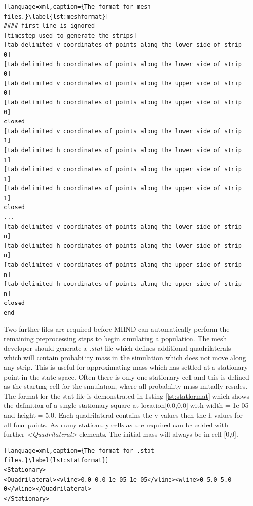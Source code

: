\documentclass[utf8]{frontiers_suppmat} %
\begin{document}
\begin{lstlisting}[language=xml,caption={The format for mesh files.}\label{lst:meshformat}]
#### first line is ignored
[timestep used to generate the strips]
[tab delimited v coordinates of points along the lower side of strip 0]
[tab delimited h coordinates of points along the lower side of strip 0]
[tab delimited v coordinates of points along the upper side of strip 0]
[tab delimited h coordinates of points along the upper side of strip 0]
closed
[tab delimited v coordinates of points along the lower side of strip 1]
[tab delimited h coordinates of points along the lower side of strip 1]
[tab delimited v coordinates of points along the upper side of strip 1]
[tab delimited h coordinates of points along the upper side of strip 1]
closed
...
[tab delimited v coordinates of points along the lower side of strip n]
[tab delimited h coordinates of points along the lower side of strip n]
[tab delimited v coordinates of points along the upper side of strip n]
[tab delimited h coordinates of points along the upper side of strip n]
closed
end
\end{lstlisting}

Two further files are required before MIIND can automatically perform the remaining preprocessing steps to begin simulating a population. The mesh developer should generate a \textit{.stat} file which defines additional quadrilaterals which will contain probability mass in the simulation which does not move along any strip. This is useful for approximating mass which has settled at a stationary point in the state space. Often there is only one stationary cell and this is defined as the starting cell for the simulation, where all probability mass initially resides. The format for the stat file is demonstrated in listing \ref{lst:statformat} which shows the definition of a single stationary square at location[0.0,0.0] with width = 1e-05 and height = 5.0. Each quadrilateral contains the v values then the h values for all four points. As many stationary cells as are required can be added with further \textit{\textless Quadrilateral\textgreater} elements. The initial mass will always be in cell [0,0].

\begin{lstlisting}[language=xml,caption={The format for .stat files.}\label{lst:statformat}]
<Stationary>
<Quadrilateral><vline>0.0 0.0 1e-05 1e-05</vline><wline>0 5.0 5.0 0</wline></Quadrilateral>
</Stationary>
\end{lstlisting}
\end{document}
